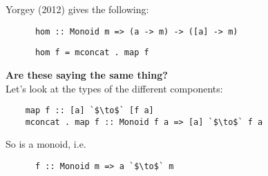 \documentclass[12pt]{article}
\begin{document}
Yorgey (2012) gives the following:

\begin{definition*}\hspace{0pt}
  \begin{normalfont}
    \begin{verbatim}
      hom :: Monoid m => (a -> m) -> ([a] -> m)
    \end{verbatim}
  \end{normalfont}
\end{definition*}

\begin{theorem*}\hspace{0pt}
  \begin{normalfont}
    \begin{verbatim}
      hom f = mconcat . map f
    \end{verbatim}
  \end{normalfont}
\end{theorem*}

{\bf Are these saying the same thing?}\\
Let's look at the types of the different components:
\begin{normalfont}
  \begin{verbatim}
    map f :: [a] `$\to$` [f a]
    mconcat . map f :: Monoid f a => [a] `$\to$` f a
  \end{verbatim}
  So  is a monoid, i.e.
  \begin{normalfont}
    \begin{verbatim}
      f :: Monoid m => a `$\to$` m
    \end{verbatim}
  \end{normalfont}
\end{normalfont}
\end{document}
